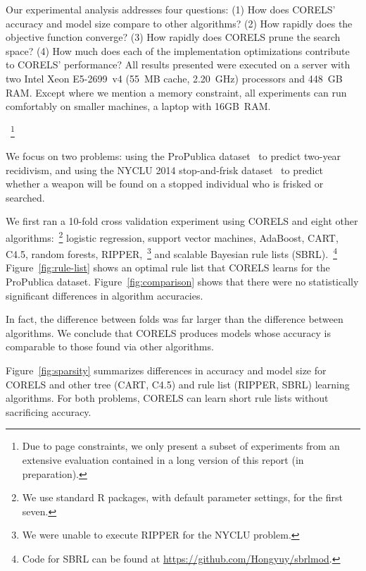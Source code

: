 
Our experimental analysis addresses four questions:
(1) How does CORELS' accuracy and model size compare to other algorithms?
(2) How rapidly does the objective function converge?
(3) How rapidly does CORELS prune the search space?
(4) How much does each of the implementation optimizations contribute to CORELS' performance?
%
All results presented were executed on a server with two Intel Xeon E5-2699~v4
(55~MB cache, 2.20~GHz) processors and 448~GB RAM.
%
Except where we mention a memory constraint, all experiments
can run comfortably on smaller machines, \eg a laptop with 16GB~RAM.\begin{kdd}
~\footnote{Due to page constraints, we only present a subset of experiments from
an extensive evaluation contained in a long version of this report (in preparation).}
\end{kdd}
%
We focus on two problems:
using the ProPublica dataset~\citep{LarsonMaKiAn16} to predict two-year recidivism,
and using the NYCLU 2014 stop-and-frisk dataset~\citep{nyclu:2014} to predict
whether a weapon will be found on a stopped individual who is frisked or searched.

We first ran a 10-fold cross validation experiment using CORELS
and eight other algorithms:~\footnote{We use standard R packages, with default
parameter settings, for the first seven.}
logistic regression, support vector machines, AdaBoost, CART, C4.5, random forests,
RIPPER,~\footnote{We were unable to execute RIPPER for the NYCLU problem.}
and scalable Bayesian rule lists (SBRL).~\footnote{Code for SBRL can be found at
\url{https://github.com/Hongyuy/sbrlmod}.}
%
Figure~\ref{fig:rule-list} shows an  optimal rule list that CORELS learns
for the ProPublica dataset.
%
Figure~\ref{fig:comparison} shows that there were no statistically significant
differences in algorithm accuracies.
\begin{arxiv}
In fact, the difference between folds was far larger than the difference
between algorithms.
We conclude that CORELS produces models whose accuracy is comparable
to those found via other algorithms.

\end{arxiv}
%
Figure~\ref{fig:sparsity} summarizes differences in accuracy and model size
for CORELS and other tree (CART, C4.5) and rule list (RIPPER, SBRL) learning algorithms.
%
For both problems, CORELS can learn short rule lists without sacrificing accuracy.

